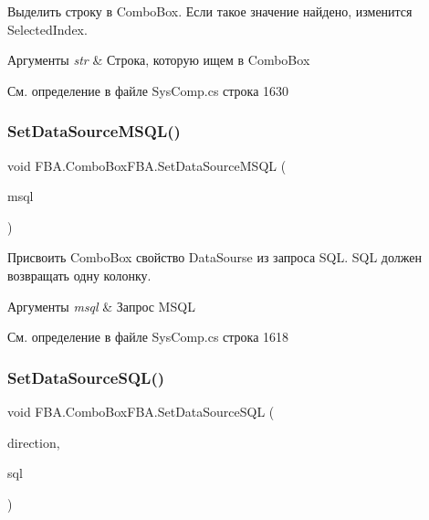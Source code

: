 Выделить строку в Combo\+Box. Если такое значение найдено, изменится Selected\+Index. 


\begin{DoxyParams}{Аргументы}
{\em str} & Строка, которую ищем в Combo\+Box\\
\hline
\end{DoxyParams}


См. определение в файле Sys\+Comp.\+cs строка 1630

\mbox{\label{class_f_b_a_1_1_combo_box_f_b_a_a9192d511b517c647cb71f364cdebfb6a}} 
\subsubsection{\texorpdfstring{Set\+Data\+Source\+M\+S\+Q\+L()}{SetDataSourceMSQL()}}
{\footnotesize\ttfamily void F\+B\+A.\+Combo\+Box\+F\+B\+A.\+Set\+Data\+Source\+M\+S\+QL (\begin{DoxyParamCaption}\item[{string}]{msql }\end{DoxyParamCaption})}



Присвоить Combo\+Box свойство Data\+Sourse из запроса S\+QL. S\+QL должен возвращать одну колонку. 


\begin{DoxyParams}{Аргументы}
{\em msql} & Запрос M\+S\+QL\\
\hline
\end{DoxyParams}


См. определение в файле Sys\+Comp.\+cs строка 1618

\mbox{\label{class_f_b_a_1_1_combo_box_f_b_a_a9d73862972c0b9003232a0f7cbb3a061}} 
\subsubsection{\texorpdfstring{Set\+Data\+Source\+S\+Q\+L()}{SetDataSourceSQL()}}
{\footnotesize\ttfamily void F\+B\+A.\+Combo\+Box\+F\+B\+A.\+Set\+Data\+Source\+S\+QL (\begin{DoxyParamCaption}\item[{\mbox{\hyperlink{namespace_f_b_a_a6ff7d5c242d98046d1980715b06d7300}{Direction\+Query}}}]{direction,  }\item[{string}]{sql }\end{DoxyParamCaption})}



